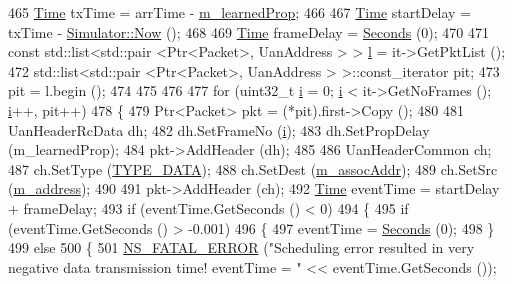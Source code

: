 \begin{DoxyCode}
465   \hyperlink{namespacens3_1_1TracedValueCallback_a7ffd3e7c142ffe7c8a1d2db9b8de38ec}{Time} txTime = arrTime - \hyperlink{classns3_1_1UanMacRc_a96cb22a43f018604074c8e73e711e9d7}{m\_learnedProp};
466 
467   \hyperlink{namespacens3_1_1TracedValueCallback_a7ffd3e7c142ffe7c8a1d2db9b8de38ec}{Time} startDelay = txTime - \hyperlink{classns3_1_1Simulator_ac3178fa975b419f7875e7105be122800}{Simulator::Now} ();
468 
469   \hyperlink{namespacens3_1_1TracedValueCallback_a7ffd3e7c142ffe7c8a1d2db9b8de38ec}{Time} frameDelay = \hyperlink{group__timecivil_ga33c34b816f8ff6628e33d5c8e9713b9e}{Seconds} (0);
470 
471   \textcolor{keyword}{const} std::list<std::pair <Ptr<Packet>, UanAddress > > \hyperlink{buildings__pathloss_8m_a5b54c0a045f179bcbbbc9abcb8b5cd4c}{l} = it->GetPktList ();
472   std::list<std::pair <Ptr<Packet>, UanAddress > >::const\_iterator pit;
473   pit = l.begin ();
474 
475 
476 
477   \textcolor{keywordflow}{for} (uint32\_t \hyperlink{bernuolliDistribution_8m_a6f6ccfcf58b31cb6412107d9d5281426}{i} = 0; \hyperlink{bernuolliDistribution_8m_a6f6ccfcf58b31cb6412107d9d5281426}{i} < it->GetNoFrames (); \hyperlink{bernuolliDistribution_8m_a6f6ccfcf58b31cb6412107d9d5281426}{i}++, pit++)
478     \{
479       Ptr<Packet> pkt = (*pit).first->Copy ();
480 
481       UanHeaderRcData dh;
482       dh.SetFrameNo (\hyperlink{bernuolliDistribution_8m_a6f6ccfcf58b31cb6412107d9d5281426}{i});
483       dh.SetPropDelay (m\_learnedProp);
484       pkt->AddHeader (dh);
485 
486       UanHeaderCommon ch;
487       ch.SetType (\hyperlink{classns3_1_1UanMacRc_ad12bbd636f03943095e1c81cd1cc24b3a21bca93e0670db9a343de5d95ff64092}{TYPE\_DATA});
488       ch.SetDest (\hyperlink{classns3_1_1UanMacRc_a67110fd422cdfab5b7d3b47fca059916}{m\_assocAddr});
489       ch.SetSrc (\hyperlink{classns3_1_1UanMacRc_ac389a0236fcf75155c45a9a1cdf0f288}{m\_address});
490 
491       pkt->AddHeader (ch);
492       \hyperlink{namespacens3_1_1TracedValueCallback_a7ffd3e7c142ffe7c8a1d2db9b8de38ec}{Time} eventTime = startDelay + frameDelay;
493       \textcolor{keywordflow}{if} (eventTime.GetSeconds () < 0)
494         \{
495           \textcolor{keywordflow}{if} (eventTime.GetSeconds () > -0.001)
496             \{
497               eventTime = \hyperlink{group__timecivil_ga33c34b816f8ff6628e33d5c8e9713b9e}{Seconds} (0);
498             \}
499           \textcolor{keywordflow}{else}
500             \{
501               \hyperlink{group__fatal_ga5131d5e3f75d7d4cbfd706ac456fdc85}{NS\_FATAL\_ERROR} (\textcolor{stringliteral}{"Scheduling error resulted in very negative data transmission
       time! eventTime = "} << eventTime.GetSeconds ());

\end{DoxyCode}
